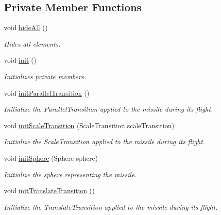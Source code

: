 \subsection*{Private Member Functions}
\begin{DoxyCompactItemize}
\item 
void \hyperlink{classbattleship2D_1_1ui_1_1Missile_a51c3f1a3cb6456b18aa3e523b9673641}{hide\-All} ()
\begin{DoxyCompactList}\small\item\em Hides all elements. \end{DoxyCompactList}\item 
void \hyperlink{classbattleship2D_1_1ui_1_1Missile_a3a765df81bc09c4aaf927b4c879c8a0d}{init} ()
\begin{DoxyCompactList}\small\item\em Initializes private members. \end{DoxyCompactList}\item 
void \hyperlink{classbattleship2D_1_1ui_1_1Missile_a5082e229045aa10ef880d4729d06ff49}{init\-Parallel\-Transition} ()
\begin{DoxyCompactList}\small\item\em Initialize the Parallel\-Transition applied to the missile during its flight. \end{DoxyCompactList}\item 
void \hyperlink{classbattleship2D_1_1ui_1_1Missile_adae455ab7df1206f605bfab4470c9e34}{init\-Scale\-Transition} (Scale\-Transition scale\-Transition)
\begin{DoxyCompactList}\small\item\em Initialize the Scale\-Transition applied to the missile during its flight. \end{DoxyCompactList}\item 
void \hyperlink{classbattleship2D_1_1ui_1_1Missile_aa0eb0a715333ce468f9d80c6f9d7da50}{init\-Sphere} (Sphere sphere)
\begin{DoxyCompactList}\small\item\em Initialize the sphere representing the missile. \end{DoxyCompactList}\item 
void \hyperlink{classbattleship2D_1_1ui_1_1Missile_adbffa08aa2496ef3bf38e66eaf2c6331}{init\-Translate\-Transition} ()
\begin{DoxyCompactList}\small\item\em Initialize the Translate\-Transition applied to the missile during its flight. \end{DoxyCompactList}\end{DoxyCompactItemize}
